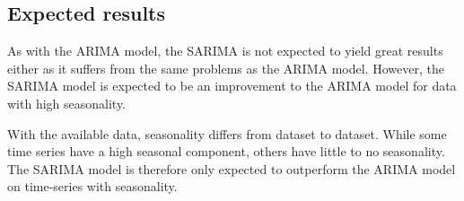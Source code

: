   \subsection{Expected results}
  As with the ARIMA model, the SARIMA is not expected to yield great results either as it suffers from the same problems as the ARIMA model.
  However, the SARIMA model is expected to be an improvement to the ARIMA model for data with high seasonality.

  With the available data, seasonality differs from dataset to dataset. While some time series have a high seasonal component,
  others have little to no seasonality.
  The SARIMA model is therefore only expected to outperform the ARIMA model on time-series with seasonality.

\fi